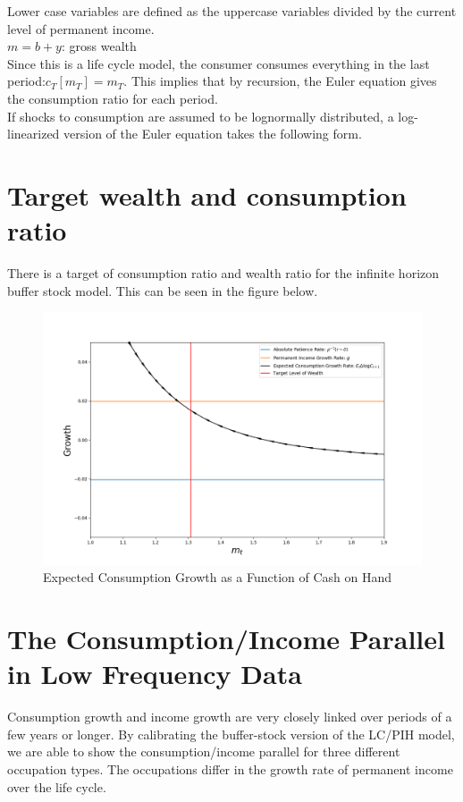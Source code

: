\documentclass[]{article}
\providecommand{\EqDir}{Equations}
\begin{document}
Lower case variables are defined as the uppercase variables divided by the current level of permanent income. \\

$m = b+y$: gross wealth \\

Since this is a life cycle model, the consumer consumes everything in the last period:$c_T[m_T] = m_T$. This implies that by recursion, the Euler equation gives the consumption ratio for each period. \\

If shocks to consumption are assumed to be lognormally distributed, a log-linearized version of the Euler equation takes the following form.\\


\newpage

\section{Target wealth and consumption ratio}
There is a target of consumption ratio and wealth ratio for the infinite horizon buffer stock model. This can be seen in the figure below.\\

\begin{figure}[h]
\centerline{\includegraphics[width=6in]{Figures/Figure1a.png}}
\label{figure:1}
\caption{Expected Consumption Growth as a Function of Cash on Hand}
\end{figure}


\section{The Consumption/Income Parallel in Low Frequency Data}
Consumption growth and income growth are very closely linked over periods of a few years or longer. By calibrating the buffer-stock version of the LC/PIH model, we are able to show the consumption/income parallel for three different occupation types. The occupations differ in the growth rate of permanent income over the life cycle. \\
\end{document}
